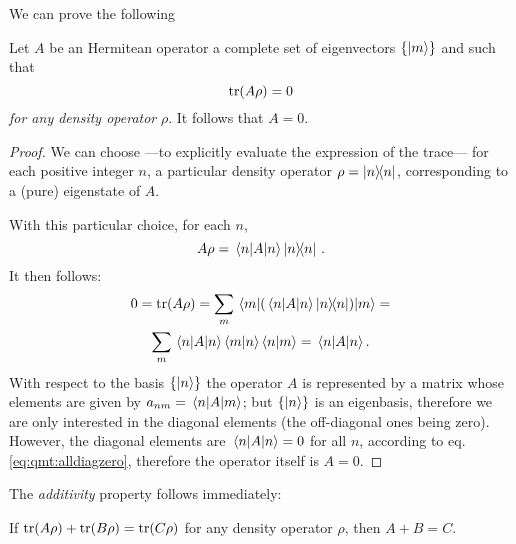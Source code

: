 We can prove the following
\begin{proposition}
  Let $A$ be an Hermitean operator
  a complete set of eigenvectors $\{\ket{m}\}$
  and
  such that
  $$
    \tr(A\rho) = 0 
  $$
  \emph{for any density operator} $\rho$.
  It follows that $A = 0$.

  \begin{proof}
    We can choose
    ---to explicitly evaluate the expression of the trace---
    for each positive integer $n$,
    a particular density operator $\rho = \ketbra{n}$,
    corresponding to a (pure) eigenstate of $A$.

    With this particular choice,
    for each $n$,
    $$
      A\rho = \mel{n}{A}{n}\ketbra{n}\,.
    $$
    It then follows:
    \begin{multline}\label{eq:qmt:alldiagzero}
      0 = \tr(A\rho) = \sum_{m}\mel{m}{ ( \mel{n}{A}{n}\ketbra{n} ) }{m} = \\
          \sum_{m} \mel{n}{A}{n} \braket{m}{n} \braket{n}{m}
        = \mel{n}{A}{n} .
    \end{multline}
    With respect to the basis $\left\{\ket{n}\right\}$ the operator $A$ is
    represented by a matrix whose elements are given by $a_{nm} = \mel{n}{A}{m}$;
    but $\left\{\ket{n}\right\}$ is an eigenbasis, therefore we are only interested in the diagonal
    elements (the off-diagonal ones being zero).
    However, the diagonal elements are  $\mel{n}{A}{n} = 0$
    for all $n$, according to eq. \eqref{eq:qmt:alldiagzero}, therefore the operator itself is $A=0$.
  \end{proof}
\end{proposition}

The \emph{additivity} property follows immediately:

\begin{corollary}
If $\tr(A\rho) + \tr(B\rho) = \tr(C\rho)$ for any density operator $\rho$,
then $A + B = C$.
\end{corollary}
